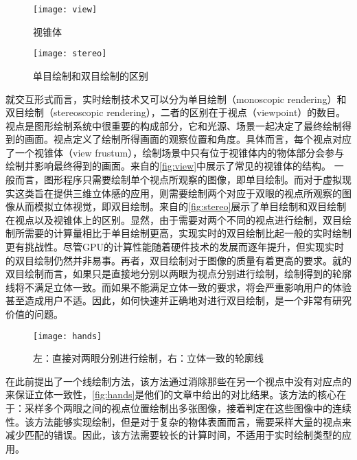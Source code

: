 \begin{figure}[!t]
    \centering
    \texttt{[image: view]}
    \caption{\label{fig:view}
    视锥体}
\end{figure}

\begin{figure}[!b]
    \centering
    \texttt{[image: stereo]}
    \caption{\label{fig:stereo}
    单目绘制和双目绘制的区别}
\end{figure}

就交互形式而言，实时绘制技术又可以分为单目绘制（monoscopic rendering）和双目绘制（stereoscopic rendering），二者的区别在于视点（viewpoint）的数目。视点是图形绘制系统中很重要的构成部分，它和光源、场景一起决定了最终绘制得到的画面。视点定义了绘制所得画面的观察位置和角度。具体而言，每个视点对应了一个视锥体（view frustum），绘制场景中只有位于视锥体内的物体部分会参与绘制并影响最终得到的画面。来自\cite{learnopengl}的\autoref{fig:view}中展示了常见的视锥体的结构。
一般而言，图形程序只需要绘制单个视点所观察的图像，即单目绘制。而对于虚拟现实这类旨在提供三维立体感的应用，则需要绘制两个对应于双眼的视点所观察的图像从而模拟立体视觉，即双目绘制。来自\cite{topicsinopengl}的\autoref{fig:stereo}展示了单目绘制和双目绘制在视点以及视锥体上的区别。显然，由于需要对两个不同的视点进行绘制，双目绘制所需要的计算量相比于单目绘制更高，实现实时的双目绘制比起一般的实时绘制更有挑战性。尽管GPU的计算性能随着硬件技术的发展而逐年提升，但实现实时的双目绘制仍然并非易事。再者，双目绘制对于图像的质量有着更高的要求。就\vdl{}的双目绘制而言，如果只是直接地分别以两眼为视点分别进行绘制，绘制得到的轮廓线将不满足立体一致。而如果不能满足立体一致的要求，将会严重影响用户的体验甚至造成用户不适。因此，如何快速并正确地对\vdp{}进行双目绘制，是一个非常有研究价值的问题。

\begin{figure}[!t]
    \centering
    \texttt{[image: hands]}
    \caption{\label{fig:hands}
    左：直接对两眼分别进行绘制，右：立体一致的轮廓线}
\end{figure}

\citeauthor{kim2013stereoscopic}在此前提出了一个\stc{}线绘制方法\cite{kim2013stereoscopic}，该方法通过消除那些在另一个视点中没有对应点的\vdp{}来保证立体一致性，\autoref{fig:hands}是他们的文章中给出的对比结果。该方法的核心在于：采样多个两眼之间的视点位置绘制出多张图像，接着判定\vdp{}在这些图像中的连续性。该方法能够实现\stc{}\vdl{}绘制，但是对于复杂的物体表面而言，需要采样大量的视点来减少匹配的错误。因此，该方法需要较长的计算时间，不适用于实时绘制类型的应用。

